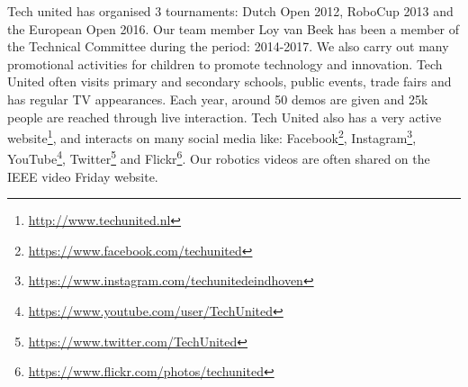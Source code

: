 Tech united has organised 3 tournaments: Dutch Open 2012, RoboCup 2013 and the European Open 2016. 
Our team member Loy van Beek has been a member of the Technical Committee during the period: 2014-2017.
We also carry out many promotional activities for children to promote technology and innovation. 
Tech United often visits primary and secondary schools, public events, trade fairs and has regular TV appearances. 
Each year, around 50 demos are given and 25k people are reached through live interaction.
Tech United also has a very active website\footnote{\url{http://www.techunited.nl}}, and interacts on many social media like: Facebook\footnote{\url{https://www.facebook.com/techunited}}, Instagram\footnote{\url{https://www.instagram.com/techunitedeindhoven}}, YouTube\footnote{\url{https://www.youtube.com/user/TechUnited}}, Twitter\footnote{\url{https://www.twitter.com/TechUnited}} and Flickr\footnote{\url{https://www.flickr.com/photos/techunited}}. Our robotics videos are often shared on the IEEE video Friday website.
